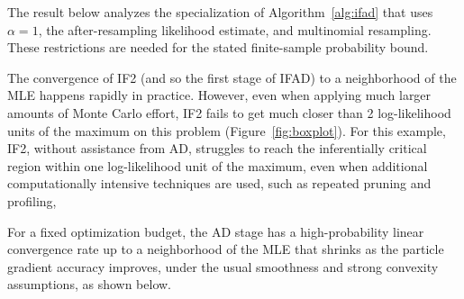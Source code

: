 \documentclass[11pt]{article}
\begin{document}
The result below analyzes the specialization of Algorithm~\ref{alg:ifad} that
uses $\alpha=1$, the after-resampling likelihood estimate, and multinomial
resampling.  These restrictions are needed for the stated finite-sample
probability bound.

The convergence of IF2 (and so the first stage of IFAD) to a neighborhood of the MLE happens rapidly in practice. 
However, even when applying much larger amounts of Monte Carlo effort, IF2 fails to get much closer than 2 log-likelihood units of the maximum on this problem (Figure~\ref{fig:boxplot}).
For this example, IF2, without assistance from AD, struggles to reach the inferentially critical region within one log-likelihood unit of the maximum, even when additional computationally intensive techniques are used, such as repeated pruning and profiling,


For a fixed optimization budget, the AD stage has a high-probability linear
convergence rate up to a neighborhood of the MLE that shrinks as the particle
gradient accuracy improves, under the usual smoothness and strong convexity
assumptions, as shown below.
\end{document}
